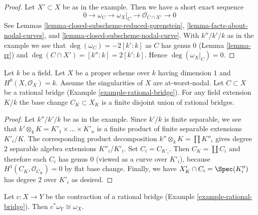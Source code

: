 \begin{proof}
Let $X' \subset X$ be as in the example. Then we have a short exact
sequence
$$
0 \to \omega_C \to \omega_X|_C \to \mathcal{O}_{C \cap X'} \to 0
$$
See Lemmas \ref{lemma-closed-subscheme-reduced-gorenstein},
\ref{lemma-facts-about-nodal-curves}, and
\ref{lemma-closed-subscheme-nodal-curve}.
With $k''/k'/k$ as in the example we see that
$\deg(\omega_C) = -2[k' : k]$ as $C$ has genus $0$
(Lemma \ref{lemma-rr})
and $\deg(C \cap X') = [k'' : k] = 2[k' : k]$.
Hence $\deg(\omega_X|_C) = 0$.
\end{proof}

\begin{lemma}
\label{lemma-rational-bridge-field-extension}
Let $k$ be a field. Let $X$ be a proper scheme over $k$ having dimension $1$
and $H^0(X, \mathcal{O}_X) = k$. Assume the singularities of $X$ are
at-worst-nodal. Let $C \subset X$ be a rational bridge
(Example \ref{example-rational-bridge}).
For any field extension $K/k$ the base change $C_K \subset X_K$
is a finite disjoint union of rational bridges.
\end{lemma}

\begin{proof}
Let $k''/k'/k$ be as in the example.
Since $k'/k$ is finite separable, we see that
$k' \otimes_k K = K'_1 \times \ldots \times K'_n$
is a finite product of finite separable extensions $K'_i/K$.
The corresponding product decomposition
$k'' \otimes_k K = \prod K''_i$ gives degree $2$
separable algebra extensions $K''_i/K'_i$.
Set $C_i = C_{K'_i}$. Then $C_K = \coprod C_i$
and therefore each $C_i$ has genus $0$ (viewed as a curve
over $K'_i$), because $H^1(C_K, \mathcal{O}_{C_K}) = 0$
by flat base change.
Finally, we have $X'_K \cap C_i = \Spec(K''_i)$ has degree $2$
over $K'_i$ as desired.
\end{proof}

\begin{lemma}
\label{lemma-rational-bridge-canonical}
Let $c : X \to Y$ be the contraction of a rational bridge
(Example \ref{example-rational-bridge}).
Then $c^*\omega_Y \cong \omega_X$.
\end{lemma}

